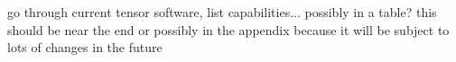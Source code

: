 go through current tensor software, list capabilities... possibly in a table?
this should be near the end or possibly in the appendix because it will be subject to lots of changes in the future

